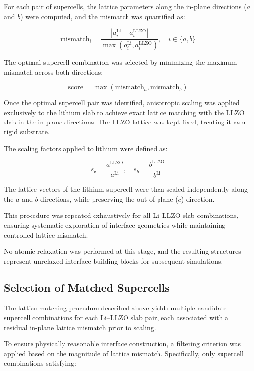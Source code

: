 \documentclass[12pt,a4paper,oneside]{book}
\begin{document}
For each pair of supercells, the lattice parameters along the in-plane directions
($a$ and $b$) were computed, and the mismatch was quantified as:

\begin{equation}
\text{mismatch}_i = \frac{|a_i^{\mathrm{Li}} - a_i^{\mathrm{LLZO}}|}{\max(a_i^{\mathrm{Li}}, a_i^{\mathrm{LLZO}})},
\quad i \in \{a,b\}
\end{equation}

The optimal supercell combination was selected by minimizing the maximum mismatch
across both directions:

\begin{equation}
\text{score} = \max(\text{mismatch}_a, \text{mismatch}_b)
\end{equation}

Once the optimal supercell pair was identified, anisotropic scaling was applied
exclusively to the lithium slab to achieve exact lattice matching with the LLZO slab
in the in-plane directions. The LLZO lattice was kept fixed, treating it as a rigid
substrate.

The scaling factors applied to lithium were defined as:

\begin{equation}
s_a = \frac{a^{\mathrm{LLZO}}}{a^{\mathrm{Li}}}, \quad
s_b = \frac{b^{\mathrm{LLZO}}}{b^{\mathrm{Li}}}
\end{equation}

The lattice vectors of the lithium supercell were then scaled independently along
the $a$ and $b$ directions, while preserving the out-of-plane ($c$) direction.

This procedure was repeated exhaustively for all Li--LLZO slab combinations,
ensuring systematic exploration of interface geometries while maintaining
controlled lattice mismatch.

No atomic relaxation was performed at this stage, and the resulting structures
represent unrelaxed interface building blocks for subsequent simulations.

\subsection{Selection of Matched Supercells}

The lattice matching procedure described above yields multiple candidate
supercell combinations for each Li--LLZO slab pair, each associated with a
residual in-plane lattice mismatch prior to scaling.

To ensure physically reasonable interface construction, a filtering criterion
was applied based on the magnitude of lattice mismatch. Specifically, only
supercell combinations satisfying:
\end{document}
